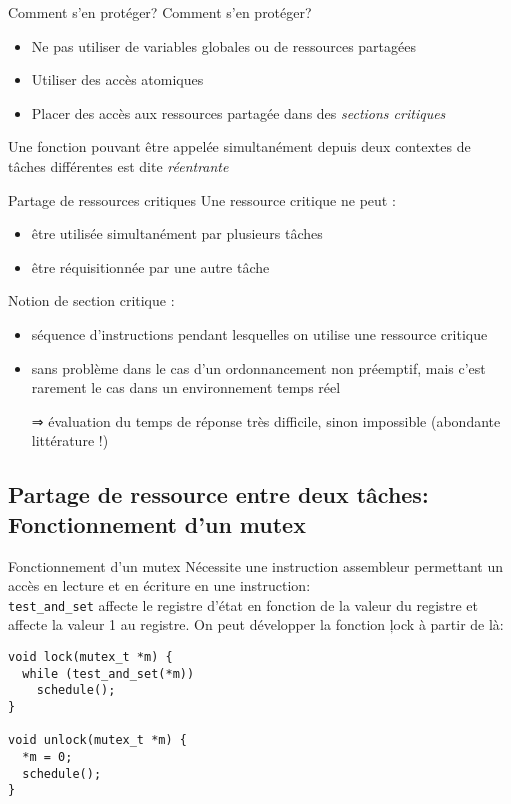\begin{frame}{Comment s'en protéger?}
  Comment s'en protéger?
  \begin{itemize}
  \item  Ne  pas  utiliser  de  variables globales  ou  de  ressources
    partagées
  \item Utiliser des accès atomiques
  \item   Placer  des   accès   aux  ressources   partagée  dans   des
    \emph{sections critiques}
  \end{itemize}
  Une  fonction  pouvant  être  appelée simultanément  depuis  deux
  contextes de tâches différentes est dite \emph{réentrante}
\end{frame}

\begin{frame}{Partage de ressources critiques}
  Une ressource critique ne peut :
  \begin{itemize}
  \item être utilisée simultanément par plusieurs tâches
  \item être réquisitionnée par une autre tâche
  \end{itemize}
  Notion de section critique :
  \begin{itemize}
  \item  séquence  d'instructions pendant  lesquelles  on utilise  une
    ressource critique
  \item sans  problème dans le cas d'un  ordonnancement non préemptif,
    mais  c'est rarement  le cas  dans un  environnement temps  réel
  \item[⇒]  évaluation  du  temps  de réponse  très  difficile,  sinon
    impossible (abondante littérature !)
  \end{itemize}
\end{frame}

\subsection{Partage de ressource entre deux tâches: Fonctionnement d'un mutex}

\begin{frame}[fragile]{Fonctionnement d'un mutex}
  Nécessite une instruction assembleur  permettant un accès en lecture
  et en écriture  en une instruction: \\
  \texttt{test\_and\_set} affecte le registre d'état en fonction de la
  valeur  du registre  et affecte  la valeur  1 au  registre.  On peut
  développer la fonction \c{lock} à partir de là:
  \begin{lstlisting}
void lock(mutex_t *m) {
  while (test_and_set(*m))
    schedule();
}

void unlock(mutex_t *m) {
  *m = 0;
  schedule();
}
  \end{lstlisting}
\end{frame}

